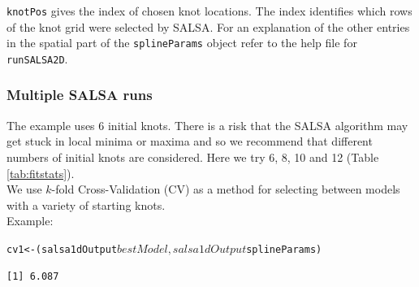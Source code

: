 {\tt knotPos} gives the index of chosen knot locations.  The index identifies which rows of the knot grid were selected by SALSA.  For an explanation of the other entries in the spatial part of the {\tt splineParams} object refer to the help file for {\tt runSALSA2D}.

\begin{frame}[fragile]
\frametitle{Multiple SALSA runs}

\noindent The example uses 6 initial knots.  There is a risk that the SALSA algorithm may get stuck in local minima or maxima and so we recommend that different numbers of initial knots are considered.  Here we try 6, 8, 10 and 12 (Table \ref{tab:fitstats}).  \\

\noindent We use $k$-fold Cross-Validation (CV) as a method for selecting between models with a variety of starting knots.\\

\noindent Example:
\begin{knitrout}\footnotesize
{}\color{fgcolor}
\end{knitrout}

\begin{knitrout}\footnotesize
{}\color{fgcolor}\begin{kframe}
\begin{alltt}
cv1 <- (salsa1dOutput$bestModel, 
           salsa1dOutput$splineParams)
\end{alltt}
\begin{verbatim}
[1] 6.087
\end{verbatim}
\end{kframe}
\end{knitrout}

\end{frame}

